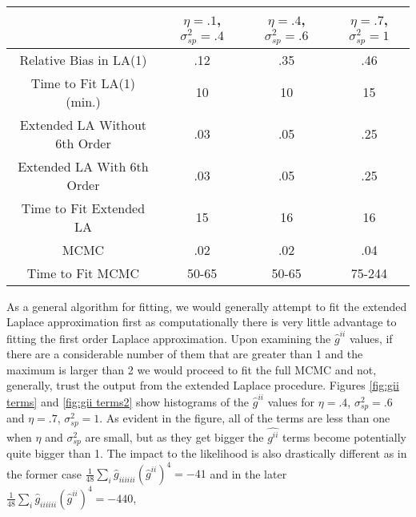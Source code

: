 \documentclass[11pt]{isuthesis}
\begin{document}
	\begin{table}[h]
		\begin{center}
			\begin{tabular}{ |c|c|c|c| } 
				\hline
				& $\eta=.1$, $\sigma_{sp}^2=.4$&$\eta=.4$, $\sigma_{sp}^2=.6$& $\eta=.7$, $\sigma_{sp}^2=1$\\
				\hline
				Relative Bias in LA(1) & .12 & .35 & .46\\ 
				Time to Fit LA(1) (min.)& 10 & 10 & 15\\
				\hline
				Extended LA Without 6th Order & .03 & .05 & .25\\
				Extended LA With 6th Order& .03 & .05 & .25\\
				Time to Fit Extended LA & 15 & 16 &  16\\
				\hline
				MCMC & .02 & .02 & .04\\
				Time to Fit MCMC  & 50-65 & 50-65 & 75-244\\
				\hline
			\end{tabular}
		\end{center}
		\label{Simulations}
	\end{table}
	  As a general algorithm for fitting, we would generally attempt to fit the extended Laplace approximation first as computationally there is very little advantage to fitting the first order Laplace approximation.  Upon examining the $\hat{g}^{ii}$ values, if there are a considerable number of them that are greater than 1 and the maximum is larger than 2 we would proceed to fit the full MCMC and not, generally, trust the output from the extended Laplace procedure.  Figures \ref{fig:gii terms} and \ref{fig:gii terms2} show histograms of the $\hat{g}^{ii}$ values for $\eta=.4$, $\sigma_{sp}^2=.6$ and $\eta=.7$, $\sigma_{sp}^2=1$.  As evident in the figure, all of the terms are less than one when $\eta$ and $\sigma_{sp}^2$ are small, but as they get bigger the $\hat{g^{ii}}$ terms become potentially quite bigger than 1.  The impact to the likelihood is also drastically different as in the former case $\frac{1}{48}\sum_{i}\hat{g}_{iiiiii}(\hat{g}^{ii})^4=-41$ and in the later $\frac{1}{48}\sum_{i}\hat{g}_{iiiiii}(\hat{g}^{ii})^4=-440$,
	
\end{document}
